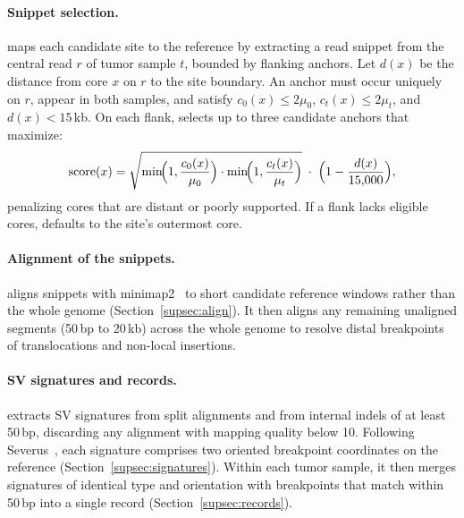 \paragraph{Snippet selection.}
\tool maps each candidate site to the reference by extracting a read snippet from the central read $r$ of tumor sample $t$, bounded by flanking anchors.
Let $d(x)$ be the distance from core $x$ on $r$ to the site boundary.
An anchor must occur uniquely on $r$, appear in both samples, and satisfy $c_0(x)\le 2\mu_0$, $c_t(x)\le 2\mu_t$, and $d(x)<15$\,kb.
On each flank, \tool selects up to three candidate anchors that maximize:
\begin{equation}
\mathrm{score}(x)=\sqrt{\min\!\Bigl(1,\frac{c_0(x)}{\mu_0}\Bigr)\cdot\min\!\Bigl(1,\frac{c_t(x)}{\mu_t}\Bigr)}\;\cdot\;\Bigl(1-\frac{d(x)}{15{,}000}\Bigr),
\label{eq:score}
\end{equation}
penalizing cores that are distant or poorly supported.
If a flank lacks eligible cores, \tool defaults to the site's outermost core.


\paragraph{Alignment of the snippets.}
\tool aligns snippets with minimap2~\cite{Li_2018} to short candidate reference windows rather than the whole genome (Section~\ref{supsec:align}).
It then aligns any remaining unaligned segments (50\,bp to 20\,kb) across the whole genome to resolve distal breakpoints of translocations and non-local insertions.

\vspace*{-0.3cm}
\paragraph{SV signatures and records.}
\tool extracts SV signatures from split alignments and from internal indels of at least 50\,bp, discarding any alignment with mapping quality below 10.
Following Severus~\cite{severus}, each signature comprises two oriented breakpoint coordinates on the reference (Section~\ref{supsec:signatures}).
Within each tumor sample, it then merges signatures of identical type and orientation with breakpoints that match within 50\,bp into a single record (Section~\ref{supsec:records}).

\vspace*{-0.3cm}
